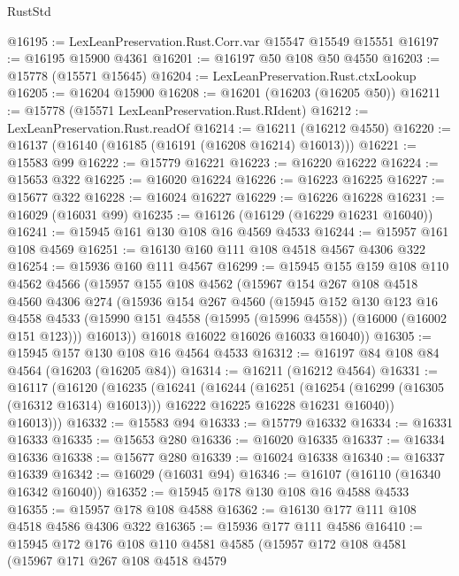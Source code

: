 \begin{lexlean}{RustStd}
\begin{coremodule}
@16195 := LexLeanPreservation.Rust.Corr.var @15547 @15549 @15551
@16197 := @16195 @15900 @4361
@16201 := @16197 @50 @108 @50 @4550
@16203 := @15778 (@15571 @15645)
@16204 := LexLeanPreservation.Rust.ctxLookup
@16205 := @16204 @15900
@16208 := @16201 (@16203 (@16205 @50))
@16211 := @15778 (@15571 LexLeanPreservation.Rust.RIdent)
@16212 := LexLeanPreservation.Rust.readOf
@16214 := @16211 (@16212 @4550)
@16220 := @16137 (@16140 (@16185 (@16191 (@16208 @16214) @16013)))
@16221 := @15583 @99
@16222 := @15779 @16221
@16223 := @16220 @16222
@16224 := @15653 @322
@16225 := @16020 @16224
@16226 := @16223 @16225
@16227 := @15677 @322
@16228 := @16024 @16227
@16229 := @16226 @16228
@16231 := @16029 (@16031 @99)
@16235 := @16126 (@16129 (@16229 @16231 @16040))
@16241 := @15945 @161 @130 @108 @16 @4569 @4533
@16244 := @15957 @161 @108 @4569
@16251 := @16130 @160 @111 @108 @4518 @4567 @4306 @322
@16254 := @15936 @160 @111 @4567
@16299 := @15945
    @155
    @159
    @108
    @110
    @4562
    @4566
    (@15957
      @155
      @108
      @4562
      (@15967
        @154
        @267
        @108
        @4518
        @4560
        @4306
        @274
        (@15936
          @154
          @267
          @4560
          (@15945
            @152
            @130
            @123
            @16
            @4558
            @4533
            (@15990 @151 @4558 (@15995 (@15996 @4558)) (@16000 (@16002 @151 @123)))
            @16013))
        @16018
        @16022
        @16026
        @16033
        @16040))
@16305 := @15945 @157 @130 @108 @16 @4564 @4533
@16312 := @16197 @84 @108 @84 @4564 (@16203 (@16205 @84))
@16314 := @16211 (@16212 @4564)
@16331 := @16117
    (@16120
      (@16235
        (@16241
          (@16244
            (@16251
              (@16254 (@16299 (@16305 (@16312 @16314) @16013)))
              @16222
              @16225
              @16228
              @16231
              @16040))
          @16013)))
@16332 := @15583 @94
@16333 := @15779 @16332
@16334 := @16331 @16333
@16335 := @15653 @280
@16336 := @16020 @16335
@16337 := @16334 @16336
@16338 := @15677 @280
@16339 := @16024 @16338
@16340 := @16337 @16339
@16342 := @16029 (@16031 @94)
@16346 := @16107 (@16110 (@16340 @16342 @16040))
@16352 := @15945 @178 @130 @108 @16 @4588 @4533
@16355 := @15957 @178 @108 @4588
@16362 := @16130 @177 @111 @108 @4518 @4586 @4306 @322
@16365 := @15936 @177 @111 @4586
@16410 := @15945
    @172
    @176
    @108
    @110
    @4581
    @4585
    (@15957
      @172
      @108
      @4581
      (@15967
        @171
        @267
        @108
        @4518
        @4579

\end{coremodule}
\end{lexlean}

